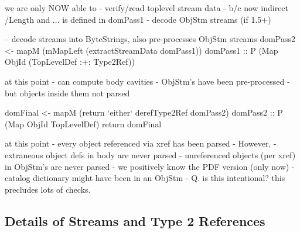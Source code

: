
we are only NOW able to
  - verify/read toplevel stream data
    - b/c now indirect /Length and ... is defined in domPass1
    - decode ObjStm streams (if 1.5+)
    
\begin{code}
    -- decode streams into ByteStrings, also pre-processes ObjStm streams
    domPass2 <- mapM
                  (mMapLeft (extractStreamData domPass1))
                  domPass1
                :: P (Map ObjId (TopLevelDef :+: Type2Ref))
\end{code}

at this point
 - can compute body cavities
 - ObjStm's have been pre-processed
   - but objects inside them not parsed

\begin{code}
    domFinal <- mapM
                 (return `either` derefType2Ref domPass2)
                  domPass2
                :: P (Map ObjId TopLevelDef)
    return domFinal
\end{code}

at this point
 - every object referenced via xref has been parsed
 - However,
   - extraneous object defs in body are never parsed
   - unreferenced objects (per xref) in ObjStm's are never parsed
 - we positively know the PDF version (only now)
   - catalog dictionary might have been in an ObjStm
   - Q. is this intentional? this precludes lots of checks.

\subsection{Details of Streams and Type 2 References}

